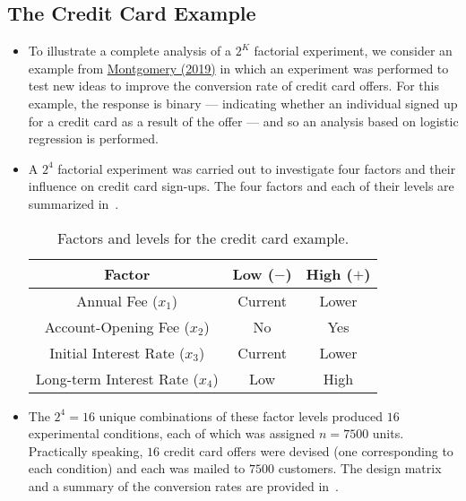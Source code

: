 \subsection{The Credit Card Example}
\begin{itemize}
    \item To illustrate a complete analysis of a $ 2^K $ factorial experiment, we consider an example from \href{https://www.wiley.com/en-ca/Design+and+Analysis+of+Experiments C+10th+Edition-p-9781119492443}{Montgomery (2019)}
          in which an experiment was performed to test new ideas to improve the conversion rate of credit
          card offers. For this example, the response is binary --- indicating whether an individual signed up for
          a credit card as a result of the offer --- and so an analysis based on logistic regression is performed.
    \item A $ 2^4 $ factorial experiment was carried out to investigate four factors and their influence on credit card
          sign-ups. The four factors and each of their levels are summarized in~.
          \begin{table}[!htbp]
              \centering
              \caption{Factors and levels for the credit card example.}\label{tab:creditcard1}
              \begin{NiceTabular}{ccc}
                  \toprule
                  Factor & Low ($ - $) & High ($ + $)\\
                  \midrule
                  Annual Fee ($ x_1 $) & Current & Lower\\
                  Account-Opening Fee ($ x_2 $) & No & Yes\\
                  Initial Interest Rate ($ x_3 $) & Current & Lower\\
                  Long-term Interest Rate ($ x_4 $) & Low & High\\
                  \bottomrule
              \end{NiceTabular}
          \end{table}
    \item The $2^4=16$ unique combinations of these factor levels produced $16$ experimental conditions, each
          of which was assigned $n = 7500$ units. Practically speaking, $16$ credit card offers were devised (one
          corresponding to each condition) and each was mailed to $7500$ customers. The design matrix and a
          summary of the conversion rates are provided in~.
          \begin{table}[!htbp]

\end{table}
\end{itemize}
